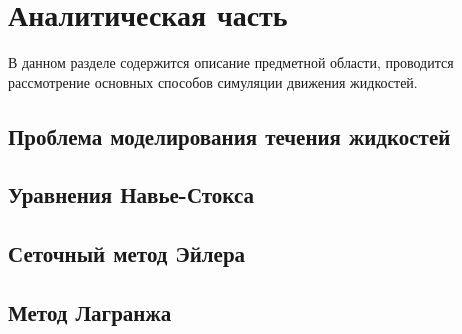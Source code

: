 \section{Аналитическая часть}

В данном разделе содержится описание предметной области, проводится рассмотрение основных способов симуляции движения жидкостей.

\subsection{Проблема моделирования течения жидкостей}

\subsection{Уравнения Навье-Стокса}

\subsection{Сеточный метод Эйлера}

\subsection{Метод Лагранжа}

\pagebreak